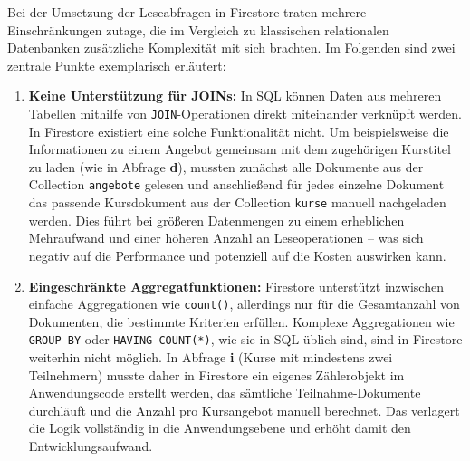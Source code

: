 \documentclass[12pt,a4paper%
              ,oneside     %
              ,titlepage
              ,DIV=13
              ,headinclude
              ,footinclude=false%
              ,cleardoublepage=empty%
              ,parskip=half,
              BCOR=0mm,
              ]{scrreprt}
\begin{document}
Bei der Umsetzung der Leseabfragen in Firestore traten mehrere Einschränkungen zutage, die im Vergleich zu klassischen relationalen Datenbanken zusätzliche Komplexität mit sich brachten. Im Folgenden sind zwei zentrale Punkte exemplarisch erläutert:

\begin{enumerate}
	\item \textbf{Keine Unterstützung für JOINs:} 
	In SQL können Daten aus mehreren Tabellen mithilfe von \texttt{JOIN}-Operationen direkt miteinander verknüpft werden. In Firestore existiert eine solche Funktionalität nicht. Um beispielsweise die Informationen zu einem Angebot gemeinsam mit dem zugehörigen Kurstitel zu laden (wie in Abfrage \textbf{d}), mussten zunächst alle Dokumente aus der Collection \texttt{angebote} gelesen und anschließend für jedes einzelne Dokument das passende Kursdokument aus der Collection \texttt{kurse} manuell nachgeladen werden. Dies führt bei größeren Datenmengen zu einem erheblichen Mehraufwand und einer höheren Anzahl an Leseoperationen – was sich negativ auf die Performance und potenziell auf die Kosten auswirken kann.
	\item \textbf{Eingeschränkte Aggregatfunktionen:}
    Firestore unterstützt inzwischen einfache Aggregationen wie \texttt{count()}, allerdings nur für die Gesamtanzahl von Dokumenten, die bestimmte Kriterien erfüllen. Komplexe Aggregationen wie \texttt{GROUP BY} oder \texttt{HAVING COUNT(*)}, wie sie in SQL üblich sind, sind in Firestore weiterhin nicht möglich. In Abfrage \textbf{i} (Kurse mit mindestens zwei Teilnehmern) musste daher in Firestore ein eigenes Zählerobjekt im Anwendungscode erstellt werden, das sämtliche Teilnahme-Dokumente durchläuft und die Anzahl pro Kursangebot manuell berechnet. Das verlagert die Logik vollständig in die Anwendungsebene und erhöht damit den Entwicklungsaufwand.
\end{enumerate}
\end{document}
